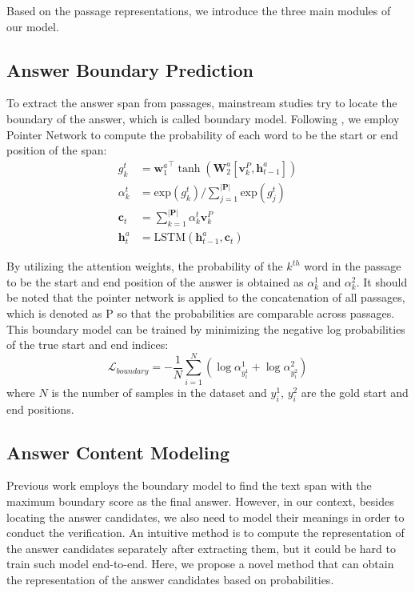 \documentclass[11pt,a4paper]{article}
\newcommand{\matr}[1]{\mathbf{#1}}
\renewcommand{\vec}[1]{\mathbf{#1}}
\begin{document}
Based on the passage representations, we introduce the three main modules of our model.

\subsection{Answer Boundary Prediction}
\label{boundary}


To extract the answer span from passages, mainstream studies try to locate the boundary of the answer, which is called boundary model. Following \cite{match-lstm}, we employ Pointer Network \cite{pointer-net} to compute the probability of each word to be the start or end position of the span:
\begin{align}
	g_k^t &= {\vec{w}_{1}^{a}}^{\intercal} \tanh ( \matr{W}_{2}^a [\vec{v}_k^{P}, \vec{h}_{t-1}^{a}] ) \\
	{\alpha}_k^t &= \textrm{exp} (g_k^t) / \sum\nolimits_{j=1}^{|\matr{P}|} \textrm{exp} (g_j^t) \\
	\vec{c}_t &= \sum\nolimits_{k=1}^{|\matr{P}|} {\alpha}_k^t \vec{v}_k^{P} \\
	\vec{h}_t^a &= \textrm{LSTM} (\vec{h}_{t-1}^a, \vec{c}_t)
\end{align}




By utilizing the attention weights, the probability of the $k^{th}$ word in the passage to be the start and end position of the answer is obtained as ${\alpha}_k^1$ and ${\alpha}_k^2$. It should be noted that the pointer network is applied to the concatenation of all passages, which is denoted as $\textrm{P}$ so that the probabilities are comparable across passages. This boundary model can be trained by minimizing the negative log probabilities of the true start and end indices:
\begin{equation}
	\mathcal{L}_{boundary} = - \frac{1}{N} \sum_{i=1}^N (\log {\alpha}_{y_i^{1}}^1 + \log {\alpha}_{y_i^{2}}^2)
\end{equation}
\noindent where $N$ is the number of samples in the dataset and $y_i^{1}$, $y_i^{2}$ are the gold start and end positions.



\subsection{Answer Content Modeling}
\label{content}





Previous work employs the boundary model to find the text span with the maximum boundary score as the final answer. However, in our context, besides locating the answer candidates, we also need to model their meanings in order to conduct the verification. 
An intuitive method is to compute the representation of the answer candidates separately after extracting them, 
but it could be hard to train such model end-to-end.
Here, we propose a novel method that can obtain the representation of the answer candidates based on probabilities. 
\end{document}
